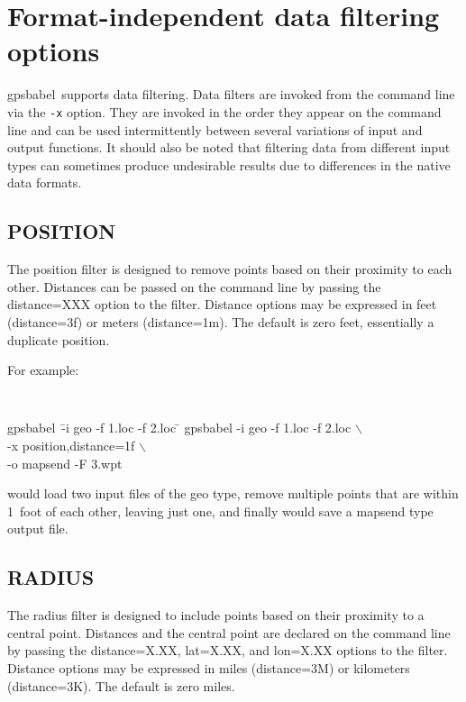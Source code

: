 \documentclass[12pt]{article}
\newcommand{\gpsbabel}{{\sc gpsbabel}}
\newcommand{\bsl}{$\backslash$}
\begin{document}
\section{Format-independent data filtering options}

\gpsbabel\ supports data filtering.  Data filters are invoked from
the command line via the {\tt -x} option.  They are invoked in the order they appear on the command
line and can be used intermittently between several variations
of input and output functions.  It should also be noted that
filtering data from different input types can sometimes produce
undesirable results due to differences in the native data formats.



\subsection{POSITION}

The position filter is designed to remove points based on their
proximity to each other.  Distances can be passed on the command 
line by passing the distance=XXX option to the filter.  Distance
options may be expressed in feet (distance=3f) or meters 
(distance=1m).  The default is zero feet, essentially a duplicate
position.

For example:
{\tt \small
\begin{tabbing}
gpsbabel~\= -i geo -f 1.loc -f 2.loc \= \kill
gpsbabel \> -i geo -f 1.loc -f 2.loc \> \bsl \+ \\
						-x position,distance=1f  \> \bsl \\
	          -o mapsend -F 3.wpt
\end{tabbing}
}
would load two input files of the {\sc geo} type, remove multiple points that are within 1~foot of each other,
leaving just one, and finally would save a {\sc mapsend} type output file.



\subsection{RADIUS}

The radius filter is designed to include points based on their
proximity to a central point.  Distances and the central point 
are declared on the command line by passing the distance=X.XX,
lat=X.XX, and lon=X.XX options to the filter.  Distance options 
may be expressed in miles (distance=3M) or kilometers (distance=3K).
The default is zero miles.
\end{document}
